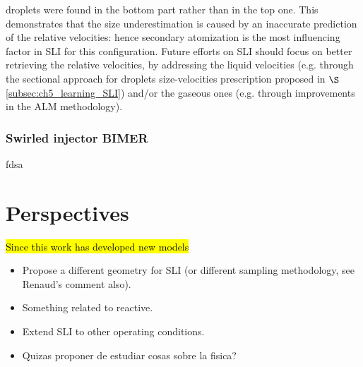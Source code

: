 droplets were found in the bottom part rather than in the top one. This demonstrates that the size underestimation is caused by an inaccurate prediction of the relative velocities: hence secondary atomization is the most influencing factor in SLI for this configuration. Future efforts on SLI should focus on better retrieving the relative velocities, by addressing the liquid velocities (e.g. through the sectional approach for droplets size-velocities prescription proposed in $\S$\ref{subsec:ch5_learning_SLI}) and/or the gaseous ones (e.g. through improvements in the ALM methodology).


\subsubsection*{Swirled injector BIMER}

fdsa



\section*{Perspectives}

\hl{Since this work has developed new models}

\begin{itemize}

	\item Propose a different geometry for SLI (or different sampling methodology, see Renaud's comment also).
	
	\item Something related to reactive.
	
	\item Extend SLI to other operating conditions.
	
	\item Quizas proponer de estudiar cosas sobre la fisica?

\end{itemize}
